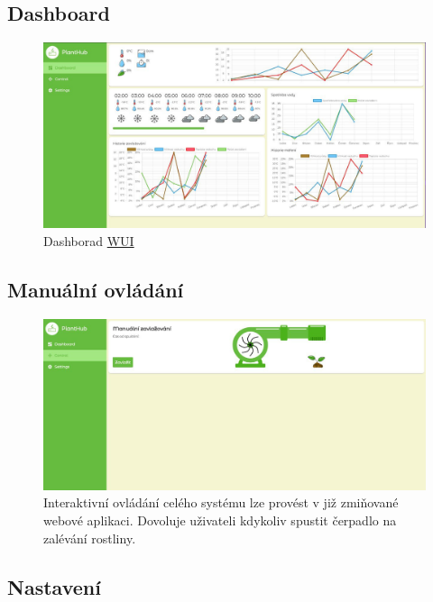 \documentclass[12pt,a4paper]{article}
\begin{document}
\subsection{Dashboard}

\begin{figure}[h]
	\centering
	\includegraphics[width=\linewidth]{web-ui.png}
	\caption{Dashborad \underline{\ac{WUI}}}
\end{figure}

\subsection{Manuální ovládání}

\begin{figure}[h]
	\centering
	\includegraphics[width=\linewidth]{web-ui-pump.png}
	\caption{Interaktivní ovládání celého systému lze provést v již
		zmiňované webové aplikaci. Dovoluje uživateli kdykoliv spustit
		čerpadlo na
		zalévání rostliny.}
\end{figure}

\subsection{Nastavení}
\end{document}
